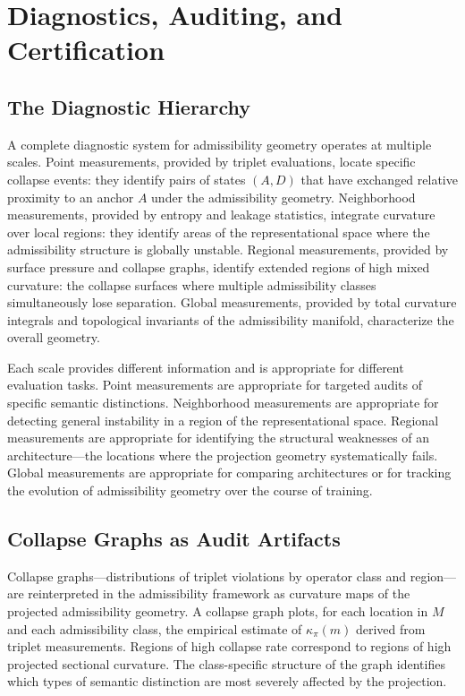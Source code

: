 \documentclass[12pt, oneside]{book}
\theoremstyle{plain-flyxion}
\theoremstyle{definition-flyxion}
\newcommand{\kpi}{\kappa_{\pi}}
\begin{document}
\chapter{Diagnostics, Auditing, and Certification}

\section{The Diagnostic Hierarchy}

A complete diagnostic system for admissibility geometry operates at multiple scales.
Point measurements, provided by triplet evaluations, locate specific collapse events: they
identify pairs of states $(A, D)$ that have exchanged relative proximity to an anchor $A$
under the admissibility geometry. Neighborhood measurements, provided by entropy and
leakage statistics, integrate curvature over local regions: they identify areas of the
representational space where the admissibility structure is globally unstable. Regional
measurements, provided by surface pressure and collapse graphs, identify extended regions
of high mixed curvature: the collapse surfaces where multiple admissibility classes
simultaneously lose separation. Global measurements, provided by total curvature
integrals and topological invariants of the admissibility manifold, characterize the
overall geometry.

Each scale provides different information and is appropriate for different evaluation
tasks. Point measurements are appropriate for targeted audits of specific semantic
distinctions. Neighborhood measurements are appropriate for detecting general instability
in a region of the representational space. Regional measurements are appropriate for
identifying the structural weaknesses of an architecture---the locations where the
projection geometry systematically fails. Global measurements are appropriate for
comparing architectures or for tracking the evolution of admissibility geometry over the
course of training.

\section{Collapse Graphs as Audit Artifacts}

Collapse graphs---distributions of triplet violations by operator class and region---are
reinterpreted in the admissibility framework as curvature maps of the projected
admissibility geometry. A collapse graph plots, for each location in $M$ and each
admissibility class, the empirical estimate of $\kpi(m)$ derived from triplet
measurements. Regions of high collapse rate correspond to regions of high projected
sectional curvature. The class-specific structure of the graph identifies which types of
semantic distinction are most severely affected by the projection.
\end{document}

